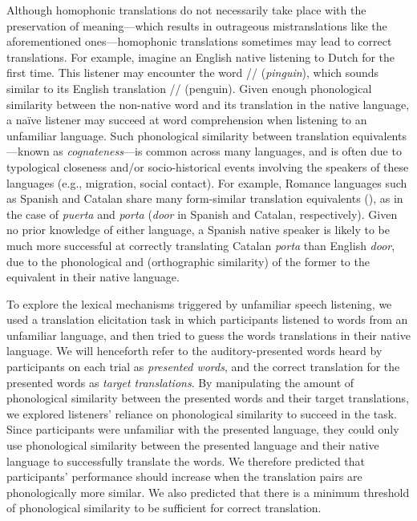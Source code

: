 \documentclass[
]{article}
\begin{document}
Although homophonic translations do not necessarily take place with the
preservation of meaning---which results in outrageous mistranslations
like the aforementioned ones---homophonic translations sometimes may
lead to correct translations. For example, imagine an English native
listening to Dutch for the first time. This listener may encounter the
word // (\emph{pinguin}), which sounds similar to its
English translation // (penguin). Given enough
phonological similarity between the non-native word and its translation
in the native language, a naïve listener may succeed at word
comprehension when listening to an unfamiliar language. Such
phonological similarity between translation equivalents---known as
\emph{cognateness}---is common across many languages, and is often due
to typological closeness and/or socio-historical events involving the
speakers of these languages (e.g., migration, social contact). For
example, Romance languages such as Spanish and Catalan share many
form-similar translation equivalents
(), as in
the case of \emph{puerta} and \emph{porta} (\emph{door} in Spanish and
Catalan, respectively). Given no prior knowledge of either language, a
Spanish native speaker is likely to be much more successful at correctly
translating Catalan \emph{porta} than English \emph{door}, due to the
phonological and (orthographic similarity) of the former to the
equivalent in their native language.

To explore the lexical mechanisms triggered by unfamiliar speech
listening, we used a translation elicitation task in which participants
listened to words from an unfamiliar language, and then tried to guess
the words translations in their native language. We will henceforth
refer to the auditory-presented words heard by participants on each
trial as \emph{presented words}, and the correct translation for the
presented words as \emph{target translations}. By manipulating the
amount of phonological similarity between the presented words and their
target translations, we explored listeners' reliance on phonological
similarity to succeed in the task. Since participants were unfamiliar
with the presented language, they could only use phonological similarity
between the presented language and their native language to successfully
translate the words. We therefore predicted that participants'
performance should increase when the translation pairs are
phonologically more similar. We also predicted that there is a minimum
threshold of phonological similarity to be sufficient for correct
translation.
\end{document}
